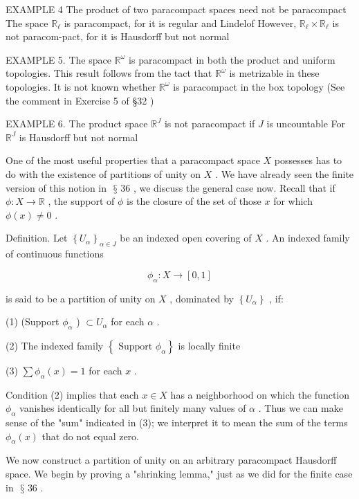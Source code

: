 \documentclass[10pt]{article}
\begin{document}
EXAMPLE 4 The product of two paracompact spaces need not be paracompact The space \({\mathbb{R}}_{\ell }\) is paracompact, for it is regular and Lindelof However, \({\mathbb{R}}_{\ell } \times  {\mathbb{R}}_{\ell }\) is not paracom-pact, for it is Hausdorff but not normal

EXAMPLE 5. The space \({\mathbb{R}}^{\omega }\) is paracompact in both the product and uniform topologies. This result follows from the tact that \({\mathbb{R}}^{\omega }\) is metrizable in these topologies. It is not known whether \({\mathbb{R}}^{\omega }\) is paracompact in the box topology (See the comment in Exercise 5 of §32 )

EXAMPLE 6. The product space \({\mathbb{R}}^{J}\) is not paracompact if \(J\) is uncountable For \({\mathbb{R}}^{J}\) is Hausdorff but not normal

One of the most useful properties that a paracompact space \(X\) possesses has to do with the existence of partitions of unity on \(X\) . We have already seen the finite version of this notion in \(\text{ § }{36}\) , we discuss the general case now. Recall that if \(\phi  : X \rightarrow  \mathbb{R}\) , the support of \(\phi\) is the closure of the set of those \(x\) for which \(\phi \left( x\right)  \neq  0\) .

Definition. Let \({\left\{  {U}_{\alpha }\right\}  }_{\alpha  \in  J}\) be an indexed open covering of \(X\) . An indexed family of continuous functions

\[
{\phi }_{\alpha } : X \rightarrow  \left\lbrack  {0,1}\right\rbrack
\]

is said to be a partition of unity on \(X\) , dominated by \(\left\{  {U}_{\alpha }\right\}\) , if:

(1) (Support \({\phi }_{\alpha }\) ) \(\subset  {U}_{\alpha }\) for each \(\alpha\) .

(2) The indexed family \(\left\{  {\text{ Support }{\phi }_{\alpha }}\right\}\) is locally finite

(3) \(\sum {\phi }_{\alpha }\left( x\right)  = 1\) for each \(x\) .

Condition (2) implies that each \(x \in  X\) has a neighborhood on which the function \({\phi }_{\alpha }\) vanishes identically for all but finitely many values of \(\alpha\) . Thus we can make sense of the "sum" indicated in (3); we interpret it to mean the sum of the terms \({\phi }_{\alpha }\left( x\right)\) that do not equal zero.

We now construct a partition of unity on an arbitrary paracompact Hausdorff space. We begin by proving a "shrinking lemma," just as we did for the finite case in \(\text{ § }{36}\) .
\end{document}
